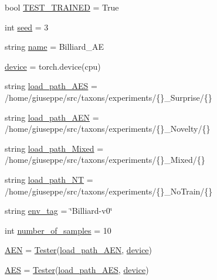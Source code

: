 \begin{DoxyCompactItemize}
\item 
bool \hyperlink{namespacetest___a_e_aa18af3dffd177ea468b742287b5328c3}{T\+E\+S\+T\+\_\+\+T\+R\+A\+I\+N\+ED} = True
\item 
int \hyperlink{namespacetest___a_e_a8a9c6e1198befd718530e83f8f1e5d58}{seed} = 3
\item 
string \hyperlink{namespacetest___a_e_aedd46085ef062fbdb40666e38f62768b}{name} = \textquotesingle{}Billiard\+\_\+\+AE\textquotesingle{}
\item 
\hyperlink{namespacetest___a_e_a2fe4876a8ef1d5961b3a7238a439bed4}{device} = torch.\+device(\textquotesingle{}cpu\textquotesingle{})
\item 
string \hyperlink{namespacetest___a_e_a70bfb3a602b04e4fb27b72ba9812a747}{load\+\_\+path\+\_\+\+A\+ES} = \textquotesingle{}/home/giuseppe/src/taxons/experiments/\{\}\+\_\+\+Surprise/\{\}\textquotesingle{}
\item 
string \hyperlink{namespacetest___a_e_a55778c18eb71346ce25752299cffa2c7}{load\+\_\+path\+\_\+\+A\+EN} = \textquotesingle{}/home/giuseppe/src/taxons/experiments/\{\}\+\_\+\+Novelty/\{\}\textquotesingle{}
\item 
string \hyperlink{namespacetest___a_e_ac24fbeab7bd192f061b5ad37746b7c49}{load\+\_\+path\+\_\+\+Mixed} = \textquotesingle{}/home/giuseppe/src/taxons/experiments/\{\}\+\_\+\+Mixed/\{\}\textquotesingle{}
\item 
string \hyperlink{namespacetest___a_e_a5ab7406072c5b846aedbb57d687ef841}{load\+\_\+path\+\_\+\+NT} = \textquotesingle{}/home/giuseppe/src/taxons/experiments/\{\}\+\_\+\+No\+Train/\{\}\textquotesingle{}
\item 
string \hyperlink{namespacetest___a_e_ad4e9f164dde3e575cfd777341ed3bacd}{env\+\_\+tag} = \char`\"{}Billiard-\/v0\char`\"{}
\item 
int \hyperlink{namespacetest___a_e_a51c1e5fcd4ef80a818f1f162b3777559}{number\+\_\+of\+\_\+samples} = 10
\item 
\hyperlink{namespacetest___a_e_a8ccf165e86a8cc0d9f583dbfb1abfacb}{A\+EN} = \hyperlink{classtest___a_e_1_1_tester}{Tester}(\hyperlink{namespacetest___a_e_a55778c18eb71346ce25752299cffa2c7}{load\+\_\+path\+\_\+\+A\+EN}, \hyperlink{namespacetest___a_e_a2fe4876a8ef1d5961b3a7238a439bed4}{device})
\item 
\hyperlink{namespacetest___a_e_afe4816898ea861698a2f82d4443c9f9b}{A\+ES} = \hyperlink{classtest___a_e_1_1_tester}{Tester}(\hyperlink{namespacetest___a_e_a70bfb3a602b04e4fb27b72ba9812a747}{load\+\_\+path\+\_\+\+A\+ES}, \hyperlink{namespacetest___a_e_a2fe4876a8ef1d5961b3a7238a439bed4}{device})

\end{DoxyCompactItemize}
